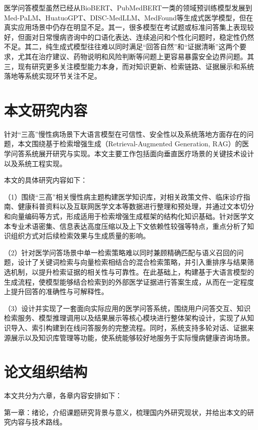 医学问答模型虽然已经从BioBERT、PubMedBERT一类的领域预训练模型发展到Med-PaLM、HuatuoGPT、DISC-MedLLM、MedFound等生成式医学模型，但在真实应用场景中仍存在明显不足。其一，很多模型在考试题或标准问答集上表现较好，但面对日常慢病咨询中的口语化表达、连续追问和个性化问题时，稳定性仍然不足。其二，纯生成式模型往往难以同时满足“回答自然”和“证据清晰”这两个要求，尤其在治疗建议、药物说明和风险判断等问题上更容易暴露安全边界问题。其三，现有研究更多关注模型能力本身，而对知识更新、检索链路、证据展示和系统落地等系统实现环节关注不足。

\section{本文研究内容}

针对“三高”慢性病场景下大语言模型在可信性、安全性以及系统落地方面存在的问题\cite{JYRJ202407001}，本文围绕基于检索增强生成（Retrieval-Augmented Generation, RAG）的医学问答系统展开研究与实现。本文主要工作包括面向垂直医疗场景的关键技术设计以及系统工程实现。

本文的具体研究内容如下：

（1）围绕“三高”相关慢性病主题构建医学知识库，对相关政策文件、临床诊疗指南、健康科普资料以及互联网医学文本等数据进行整理和预处理，并通过文本切分和向量编码等方式，形成适用于检索增强生成框架的结构化知识基础。针对医学文本专业术语密集、信息表达高度压缩以及上下文依赖性较强等特点，重点分析了知识组织方式对后续检索效果与生成质量的影响。

（2）针对医学问答场景中单一检索策略难以同时兼顾精确匹配与语义召回的问题，设计了关键词检索与向量检索相结合的混合检索策略，并引入重排序与结果筛选机制，以提升检索证据的相关性与可靠性。在此基础上，构建基于大语言模型的生成流程，使模型能够结合检索到的外部医学证据进行答案生成，从而在一定程度上提升回答的准确性与可解释性。

（3）设计并实现了一套面向实际应用的医学问答系统，围绕用户问答交互、知识检索服务、模型推理调用以及结果展示等核心模块进行整体架构设计，实现了从知识导入、索引构建到在线问答服务的完整流程。同时，系统支持多轮对话、证据来源展示以及知识库管理等功能，使系统能够较好地服务于实际慢病健康咨询场景。

\section{论文组织结构}

本文共分为六章，各章内容安排如下：

第一章：绪论，介绍课题研究背景与意义，梳理国内外研究现状，并给出本文的研究内容与技术路线。

